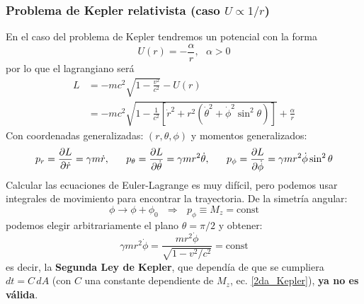 \documentclass[]{article}
\numberwithin{equation}{section}
\begin{document}
\subsubsection{Problema de Kepler relativista (caso \(U \propto 1/r\))}
En el caso del problema de Kepler tendremos un potencial con la forma
\begin{equation*}
	U(r) = -\frac{\alpha}{r}, ~~~ \alpha > 0
\end{equation*}
por lo que el lagrangiano será
\begin{align}
	L &= -mc^2 \sqrt{1 - \frac{v^2}{c^2}} - U(r)\nonumber\\
	&= -mc^2 \sqrt{1 - \frac{1}{c^2}\left[\dot{r}^2 + r^2\left(\dot{\theta}^2 + \dot{\phi}^2 \sin^2\theta \right)\right]} + \frac{\alpha}{r}
\end{align}
Con coordenadas generalizadas: \((r, \theta, \phi)\) y momentos generalizados:
\begin{equation}
	p_{r} = \dfrac{\partial L}{\partial \dot{r}} = \gamma m \dot{r}, ~~~~~ p_{\theta} = \dfrac{\partial L}{\partial \dot{\theta}} = \gamma m r^2 \dot{\theta}, ~~~~~ p_{\phi} = \dfrac{\partial L}{\partial \dot{\phi}} = \gamma m r^2 \dot{\phi} \sin^2\theta
\end{equation}
Calcular las ecuaciones de Euler-Lagrange es muy difícil, pero podemos usar integrales de movimiento para encontrar la trayectoria. De la simetría angular:
\begin{equation*}
	\phi \rightarrow \phi + \phi_{0} ~~~\Rightarrow~~~ p_{\phi} \equiv M_{z} = \mathrm{const}
\end{equation*}
podemos elegir arbitrariamente el plano \(\theta = \pi/2\) y obtener:
\begin{equation}
	\gamma m r^2 \dot{\phi} = \frac{m r^2 \dot{\phi}}{\sqrt{1 - v^2/c^2}} = \mathrm{const}
\end{equation}
es decir, la \textbf{Segunda Ley de Kepler}, que dependía de que se cumpliera \(dt = C \, dA\) (con \(C\) una constante dependiente de \(M_{z}\), ec. \ref{2da_Kepler}), \textbf{ya no es válida}.
\end{document}
